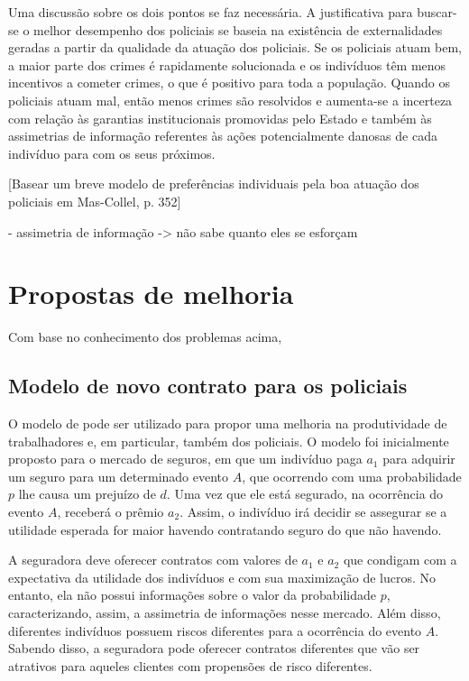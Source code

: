 \documentclass[
	article,			%
	12pt,				%
	oneside,			%
	a4paper,			%
	english,			%
	brazil,				%
	]{abntex2}
\begin{document}
Uma discussão sobre os dois pontos se faz necessária. A justificativa para buscar-se o melhor desempenho dos policiais se baseia na existência de externalidades geradas a partir da qualidade da atuação dos policiais. Se os policiais atuam bem, a maior parte dos crimes é rapidamente solucionada e os indivíduos têm menos incentivos a cometer crimes, o que é positivo para toda a população. Quando os policiais atuam mal, então menos crimes são resolvidos e aumenta-se a incerteza com relação às garantias institucionais promovidas pelo Estado e também às assimetrias de informação referentes às ações potencialmente danosas de cada indivíduo para com os seus próximos.


[Basear um breve modelo de preferências individuais pela boa atuação dos policiais em Mas-Collel, p. 352]

- assimetria de informação -> não sabe quanto eles se esforçam

\section{Propostas de melhoria}

Com base no conhecimento dos problemas acima, 

\subsection{Modelo de novo contrato para os policiais}

O modelo de  pode ser utilizado para propor uma melhoria na produtividade de trabalhadores e, em particular, também dos policiais. O modelo foi inicialmente proposto para o mercado de seguros, em que um indivíduo paga $a_1$ para adquirir um seguro para um determinado evento $A$, que ocorrendo com uma probabilidade $p$ lhe causa um prejuízo de $d$. Uma vez que ele está segurado, na ocorrência do evento $A$, receberá o prêmio $a_2$. Assim, o indivíduo irá decidir se assegurar se a utilidade esperada for maior havendo contratando seguro do que não havendo. 

A seguradora deve oferecer contratos com valores de $a_1$ e $a_2$ que condigam com a expectativa da utilidade dos indivíduos e com sua maximização de lucros. No entanto, ela não possui informações sobre o valor da probabilidade $p$, caracterizando, assim, a assimetria de informações nesse mercado. Além disso,  diferentes indivíduos possuem riscos diferentes para a ocorrência do evento $A$. Sabendo disso, a seguradora pode oferecer contratos diferentes que vão ser atrativos para aqueles clientes com propensões de risco diferentes. 
\end{document}
